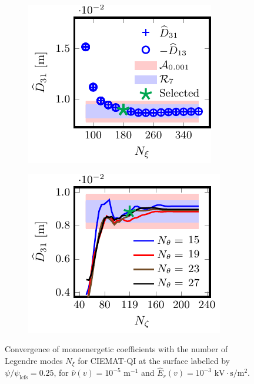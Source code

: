 \documentclass[10pt]{iopart}
\begin{document}
\begin{figure}[t]
	\begin{subfigure}[t]{0.32\textwidth}
		\includegraphics{Convergence-Legendre-CIEMAT-QI-s0250-Er-1e-3-D31-Detail}
		\caption{}
		\label{subfig:D31_convergence_Legendre_CIEMAT_QI_0250_Erho_1e-3_Detail}
	\end{subfigure}
	\begin{subfigure}[t]{0.32\textwidth}
		\includegraphics{Convergence-theta-zeta-CIEMAT-QI-s0250-Er-1e-3-D31}
		\caption{}
		\label{subfig:D31_convergence_theta_zeta_CIEMAT_QI_0250_Erho_1e-3}
	\end{subfigure}
	\caption{Convergence of monoenergetic coefficients with the number of Legendre modes $N_\xi$ for CIEMAT-QI at the surface labelled by $\psi/\psi_{\text{lcfs}}=0.25$, for $\hat{\nu}(v)=10^{-5}$ $\text{m}^{-1}$ and $\widehat{E}_r(v)=10^{-3}$ $\text{kV}\cdot\text{s}/\text{m}^2$.}
	\label{fig:Convergence_CIEMAT_QI_Er_1e-3}
\end{figure}
\end{document}
